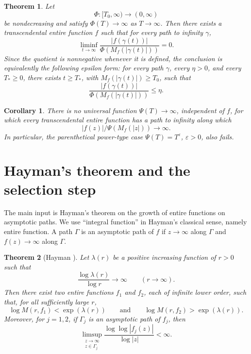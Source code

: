 \documentclass[11pt]{article}
\newtheorem{theorem}{Theorem}
\newtheorem{corollary}{Corollary}
\begin{document}
\begin{theorem}\label{thm:main}
Let
\[
\Phi:[T_0,\infty)\to(0,\infty)
\]
be nondecreasing and satisfy \(\Phi(T)\to\infty\) as \(T\to\infty\).  Then there
exists a transcendental entire function \(f\) such that for every path to
infinity \(\gamma\),
\[
\liminf_{t\to\infty}
\frac{|f(\gamma(t))|}{\Phi(M_f(|\gamma(t)|))}=0.
\]
Since the quotient is nonnegative whenever it is defined, the conclusion is
equivalently the following epsilon form: for every path \(\gamma\), every
\(\eta>0\), and every \(T_\ast\ge 0\), there exists \(t\ge T_\ast\), with
\(M_f(|\gamma(t)|)\ge T_0\), such that
\[
\frac{|f(\gamma(t))|}{\Phi(M_f(|\gamma(t)|))}\le \eta.
\]
\end{theorem}

\begin{corollary}\label{cor:third-question}
There is no universal function \(\Psi(T)\to\infty\), independent of \(f\), for
which every transcendental entire function has a path to infinity along which
\[
|f(z)|/\Psi(M_f(|z|))\to\infty.
\]
In particular, the parenthetical power-type case \(\Psi(T)=T^\varepsilon\),
\(\varepsilon>0\), also fails.
\end{corollary}

\section{Hayman's theorem and the selection step}

The main input is Hayman's theorem on the growth of entire functions on
asymptotic paths.  We use ``integral function'' in Hayman's classical sense,
namely entire function.  A path \(\Gamma\) is an asymptotic path of \(f\) if
\(z\to\infty\) along \(\Gamma\) and \(f(z)\to\infty\) along \(\Gamma\).

\begin{theorem}[Hayman {\cite[Theorem 2, p.~253]{Hayman1960}}]\label{thm:hayman}
Let \(\lambda(r)\) be a positive increasing function of \(r>0\) such that
\[
\frac{\log \lambda(r)}{\log r}\to\infty
\qquad (r\to\infty).
\]
Then there exist two entire functions \(f_1\) and \(f_2\), each of infinite
lower order, such that, for all sufficiently large \(r\),
\[
\log M(r,f_1)<\exp(\lambda(r))
\qquad\text{and}\qquad
\log M(r,f_2)>\exp(\lambda(r)).
\]
Moreover, for \(j=1,2\), if \(\Gamma_j\) is an asymptotic path of \(f_j\), then
\[
\limsup_{\substack{z\to\infty\\ z\in\Gamma_j}}
\frac{\log\log |f_j(z)|}{\log |z|}<\infty .
\]
\end{theorem}
\end{document}
